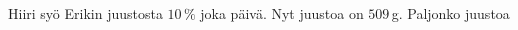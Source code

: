 \begin{multicols}{2}
\begin{tehtava}
	Hiiri syö Erikin juustosta $10\,\%$ joka päivä. Nyt juustoa on $509$\,g. Paljonko juustoa
	
	\begin{vastaus}
	\end{vastaus}
\end{tehtava}
\end{multicols}
\newpage